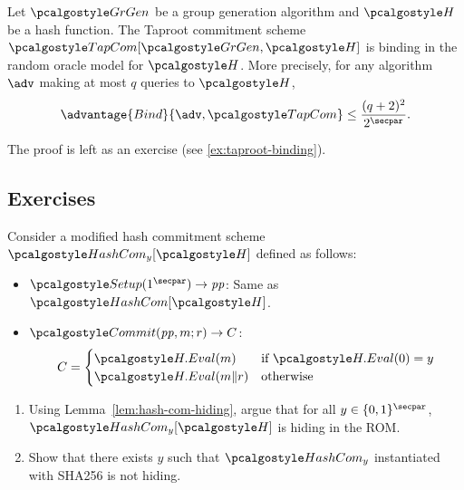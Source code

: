 \begin{lemma}\label{lem:taproot-binding}
  Let $\grgen$ be a group generation algorithm and $\algo{H}$ be a hash function.
  The Taproot commitment scheme $\algo{TapCom}[\grgen, \algo{H}]$ is binding in the random oracle model for $\algo{H}$.
  More precisely, for any algorithm $\adv$ making at most $q$ queries to $\algo{H}$,
  \[
  \advantage{Bind}{\adv, \algo{TapCom}} \leq \frac{(q+2)^2}{2^\secpar}.
  \]
\end{lemma}

The proof is left as an exercise (see \autoref{ex:taproot-binding}).

\subsection{Exercises}

\begin{exercise}\label{ex:rom-contrived-hashcom}
  Consider a modified hash commitment scheme $\algo{HashCom}_y[\algo{H}]$ defined as follows:
  \begin{itemize}
    \item $\algo{Setup}(1^\secpar) \rightarrow \params$: Same as $\algo{HashCom}[\algo{H}]$.
    \item $\algo{Commit}(\params, m; r) \rightarrow C$: 
    \begin{align*}
      C = \begin{cases}
        \algo{H.Eval}(m) & \text{if } \algo{H.Eval}(0) = y \\
        \algo{H.Eval}(m \| r) & \text{otherwise}
      \end{cases}
    \end{align*}
  \end{itemize}
  
  \begin{enumerate}
    \item Using Lemma~\ref{lem:hash-com-hiding}, argue that for all $y \in \{0,1\}^\secpar$, $\algo{HashCom}_y[\algo{H}]$ is hiding in the ROM.
    \item Show that there exists $y$ such that $\algo{HashCom}_y$ instantiated with SHA256 is not hiding.
  \end{enumerate}
\end{exercise}

